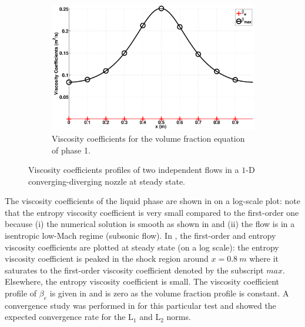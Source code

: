 \documentclass[preprint,10pt]{elsarticle}
\begin{document}
\begin{figure}[H]
        \begin{subfigure}[b]{0.495\textwidth}
                \centering
                \includegraphics[width=\textwidth]{figures/nozzle-indep-phase_liquid_beta.eps}
                \caption{Viscosity coefficients for the volume fraction equation of phase 1.}
                \label{fig:nozzle-indep-beta}
        \end{subfigure}        
        \caption{Viscosity coefficients profiles of two independent flows in a $1$-D converging-diverging nozzle at steady state.}\label{fig:nozzle-indep-visc-coeff}
\end{figure}
%
The viscosity coefficients of the liquid phase are shown in  on a log-scale plot: note that the entropy viscosity coefficient is very small compared to the first-order one because 
(i) the numerical solution is smooth as shown in  and (ii) the flow is in a isentropic low-Mach regime (subsonic flow). 
In , 
the first-order and entropy viscosity coefficients are plotted at steady state (on a log scale): the entropy viscosity 
coefficient is peaked in the shock region around $x=0.8 \ m$ where it saturates to the first-order viscosity 
coefficient denoted by the subscript $max$. Elsewhere, the entropy  viscosity coefficient is small. The viscosity coefficient profile of $\beta_e$ is given in  and is zero as the volume fraction profile is constant. A convergence study was performed in \cite{DelchiniCompFluid2014-euler} for this particular test and showed the expected convergence rate for the L$_1$ and L$_2$ norms.  
%
\end{document}
